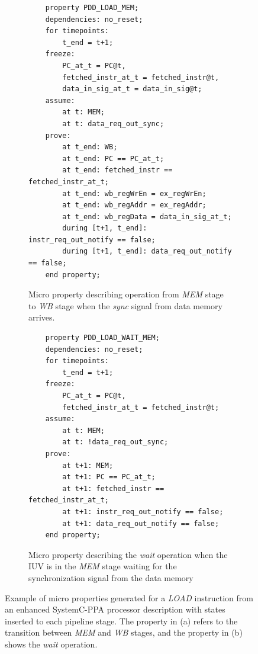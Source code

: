 \begin{figure}[htb!]
     \centering
     \begin{subfigure}[b]{\textwidth}
         \begin{lstlisting}
    property PDD_LOAD_MEM;
    dependencies: no_reset;
    for timepoints:
        t_end = t+1;
    freeze:
        PC_at_t = PC@t,
        fetched_instr_at_t = fetched_instr@t,
        data_in_sig_at_t = data_in_sig@t;
    assume:
        at t: MEM;
        at t: data_req_out_sync;
    prove:
        at t_end: WB;
        at t_end: PC == PC_at_t;
        at t_end: fetched_instr == fetched_instr_at_t;
        at t_end: wb_regWrEn = ex_regWrEn;
        at t_end: wb_regAddr = ex_regAddr;
        at t_end: wb_regData = data_in_sig_at_t;
        during [t+1, t_end]: instr_req_out_notify == false;
        during [t+1, t_end]: data_req_out_notify == false;
    end property;\end{lstlisting}
         \caption{Micro property describing operation from \textit{MEM} stage to \textit{WB} stage when the \textit{sync} signal from data memory arrives.}
         \label{subfig:load-mem-micro-ppt}
     \end{subfigure}
     \hfill
     \begin{subfigure}[b]{\textwidth}
         \begin{lstlisting}
    property PDD_LOAD_WAIT_MEM;
    dependencies: no_reset;
    for timepoints:
        t_end = t+1;
    freeze:
        PC_at_t = PC@t,
        fetched_instr_at_t = fetched_instr@t;
    assume:
        at t: MEM;
        at t: !data_req_out_sync;
    prove:
        at t+1: MEM;
        at t+1: PC == PC_at_t;
        at t+1: fetched_instr == fetched_instr_at_t;
        at t+1: instr_req_out_notify == false;
        at t+1: data_req_out_notify == false;
    end property;\end{lstlisting}
         \caption{Micro property describing the \textit{wait} operation when the IUV is in the \textit{MEM} stage waiting for the synchronization signal from the data memory}
         \label{subfig:load-wait-micro-ppt}
     \end{subfigure}
        \caption{Example of micro properties generated for a \textit{LOAD} instruction from an enhanced SystemC-PPA processor description with states inserted to each pipeline stage. The property in (a) refers to the transition between \textit{MEM} and \textit{WB} stages, and the property in (b) shows the \textit{wait} operation.}
        \label{fig:load-mem-wait-micro-ppt}
\end{figure}

